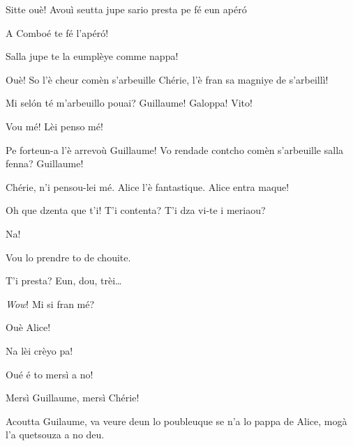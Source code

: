 \begin{drama}
{\Alicespeaks Sitte ouè! Avouì seutta jupe sario presta pe fé eun apér\'o

\Guillaumespeaks A Comboé te fé l'apér\'o!

\Cheriespeaks Salla jupe te la eumplèye comme nappa!


\Alicespeaks Ouè! So l'è cheur comèn s'arbeuille Chérie, l'è fran sa magniye de s'arbeillì!

\Cheriespeaks{} Mi sel\'on té m'arbeuillo pouai? Guillaume! Galoppa! Vito!

\Guillaumespeaks Vou mé! Lèi penso mé!


}

\Cheriespeaks{} Pe forteun-a l'è arrevoù Guillaume! Vo rendade contcho comèn s'arbeuille salla fenna? Guillaume!


\Guillaumespeaks Chérie, n’i pensou-lei mé. Alice l'è fantastique. Alice entra maque!


\Cheriespeaks Oh que dzenta que t'i! T'i contenta? T'i dza vi-te i meriaou?

\Alicespeaks Na!

\Cheriespeaks Vou lo prendre to de chouite.


\Cheriespeaks{} T'i presta? Eun, dou, trèi\ldots


\Alicespeaks \textit{Wow}! Mi si fran mé?

\Guillaumespeaks Ouè Alice!

\Alicespeaks Na lèi crèyo pa!

\Cheriespeaks Oué é to mersì a no!

\Alicespeaks Mersì Guillaume, mersì Chérie!

\Cheriespeaks{} Acoutta Guilaume, va veure deun lo poubleuque se n'a lo pappa de Alice, mogà l'a quetsouza a no deu.


\end{drama}
